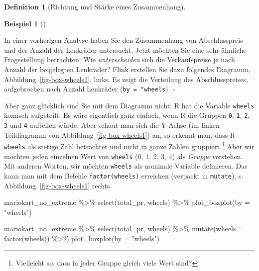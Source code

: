 \documentclass[
  a4paper,
  DIV=11]{scrreprt}
\newenvironment{Shaded}{\begin{snugshade}}{\end{snugshade}}
\newcommand{\AttributeTok}[1]{\textcolor[rgb]{0.40,0.45,0.13}{#1}}
\newcommand{\FunctionTok}[1]{\textcolor[rgb]{0.28,0.35,0.67}{#1}}
\newcommand{\NormalTok}[1]{\textcolor[rgb]{0.00,0.23,0.31}{#1}}
\newcommand{\SpecialCharTok}[1]{\textcolor[rgb]{0.37,0.37,0.37}{#1}}
\newcommand{\StringTok}[1]{\textcolor[rgb]{0.13,0.47,0.30}{#1}}
\theoremstyle{definition}
\theoremstyle{definition}
\newtheorem{example}{Beispiel}[chapter]
\theoremstyle{definition}
\newtheorem{definition}{Definition}[chapter]
\theoremstyle{remark}
\begin{document}
\begin{definition}[Richtung und Stärke eines
Zusammenhang]
\begin{example}[]\protect\hypertarget{exm-Boxplots}{}\label{exm-Boxplots}

In einer vorherigen Analyse haben Sie den Zusammenhang von
Abschlusspreis und der Anzahl der Lenkräder untersucht. Jetzt möchten
Sie eine sehr ähnliche Fragestellung betrachten: Wie
\emph{unterscheiden} sich die Verkaufspreise je nach Anzahl der
beigelegten Lenkräder? Flink erstellen Sie dazu folgendes Diagramm,
Abbildung~\ref{fig-box-wheels1}, links. Es zeigt die Verteilung des
Abschlusspreises, aufgebrochen nach Anzahl Lenkräder
(\texttt{by\ =\ "wheels}). \(\square\)

\end{example}

Aber ganz glücklich sind Sie mit dem Diagramm nicht: R hat die Variable
\texttt{wheels} komisch aufgeteilt. Es wäre eigentlich ganz einfach,
wenn R die Gruppen \texttt{0}, \texttt{1}, \texttt{2}, \texttt{3} und
\texttt{4} aufteilen würde. Aber schaut man sich die Y-Achse (im linken
Teildiagramm von Abbildung~\ref{fig-box-wheels1}) an, so erkennt man,
dass R \texttt{wheels} als stetige Zahl betrachtet und nicht in ganze
Zahlen gruppiert.\footnote{Vielleicht so, dass in jeder Gruppe gleich
  viele Wert sind?} Aber wir möchten jeden einzelnen Wert von
\texttt{wheels} (0, 1, 2, 3, 4) als \emph{Gruppe} verstehen. Mit anderen
Worten, wir möchten \texttt{wheels} als nominale Variable definieren.
Das kann man mit dem Befehle \texttt{factor(wheels)} erreichen (verpackt
in \texttt{mutate}), s. Abbildung~\ref{fig-box-wheels1} rechts.

\begin{Shaded}
\begin{Highlighting}[]

\NormalTok{mariokart\_no\_extreme }\SpecialCharTok{\%\textgreater{}\%} 
  \FunctionTok{select}\NormalTok{(total\_pr, wheels) }\SpecialCharTok{\%\textgreater{}\%} 
  \FunctionTok{plot\_boxplot}\NormalTok{(}\AttributeTok{by =} \StringTok{"wheels"}\NormalTok{)}

\NormalTok{mariokart\_no\_extreme }\SpecialCharTok{\%\textgreater{}\%} 
  \FunctionTok{select}\NormalTok{(total\_pr, wheels) }\SpecialCharTok{\%\textgreater{}\%} 
  \FunctionTok{mutate}\NormalTok{(}\AttributeTok{wheels =} \FunctionTok{factor}\NormalTok{(wheels)) }\SpecialCharTok{\%\textgreater{}\%} 
  \FunctionTok{plot\_boxplot}\NormalTok{(}\AttributeTok{by =} \StringTok{"wheels"}\NormalTok{)}
\end{Highlighting}
\end{Shaded}


\end{definition}
\end{document}
